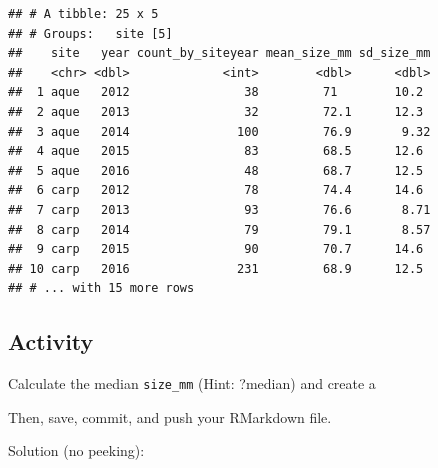 \documentclass[]{book}
\newenvironment{Shaded}{\begin{snugshade}}{\end{snugshade}}
\newcommand{\CommentTok}[1]{\textcolor[rgb]{0.56,0.35,0.01}{\textit{#1}}}
\newcommand{\DataTypeTok}[1]{\textcolor[rgb]{0.13,0.29,0.53}{#1}}
\newcommand{\KeywordTok}[1]{\textcolor[rgb]{0.13,0.29,0.53}{\textbf{#1}}}
\newcommand{\NormalTok}[1]{#1}
\newcommand{\OperatorTok}[1]{\textcolor[rgb]{0.81,0.36,0.00}{\textbf{#1}}}
\newcommand{\OtherTok}[1]{\textcolor[rgb]{0.56,0.35,0.01}{#1}}
\newcommand{\StringTok}[1]{\textcolor[rgb]{0.31,0.60,0.02}{#1}}
\begin{document}
\begin{verbatim}
## # A tibble: 25 x 5
## # Groups:   site [5]
##    site   year count_by_siteyear mean_size_mm sd_size_mm
##    <chr> <dbl>             <int>        <dbl>      <dbl>
##  1 aque   2012                38         71        10.2 
##  2 aque   2013                32         72.1      12.3 
##  3 aque   2014               100         76.9       9.32
##  4 aque   2015                83         68.5      12.6 
##  5 aque   2016                48         68.7      12.5 
##  6 carp   2012                78         74.4      14.6 
##  7 carp   2013                93         76.6       8.71
##  8 carp   2014                79         79.1       8.57
##  9 carp   2015                90         70.7      14.6 
## 10 carp   2016               231         68.9      12.5 
## # ... with 15 more rows
\end{verbatim}

\hypertarget{activity-3}{%
\subsection{Activity}\label{activity-3}}

Calculate the median \texttt{size\_mm} (Hint: ?median) and create a

Then, save, commit, and push your RMarkdown file.

Solution (no peeking):

\begin{Shaded}
\end{Shaded}
\end{document}

